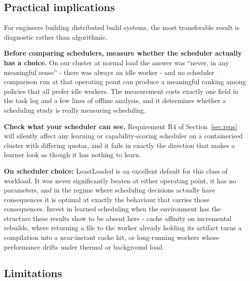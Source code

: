 \documentclass[final,5p,times,twocolumn]{elsarticle}
\begin{document}
\subsection{Practical implications}

For engineers building distributed build systems, the most transferable result is diagnostic rather than algorithmic.

\textbf{Before comparing schedulers, measure whether the scheduler actually has a choice.} On our cluster at normal load the answer was ``never, in any meaningful sense'' - there was always an idle worker - and no scheduler comparison run at that operating point can produce a meaningful ranking among policies that all prefer idle workers. The measurement costs exactly one field in the task log and a few lines of offline analysis, and it determines whether a scheduling study is really measuring scheduling.

\textbf{Check what your scheduler can see.} Requirement R4 of Section~\ref{sec:reqs} will silently affect any learning or capability-scoring scheduler on a containerised cluster with differing quotas, and it fails in exactly the direction that makes a learner look as though it has nothing to learn.

\textbf{On scheduler choice:} LeastLoaded is an excellent default for this class of workload. It was never significantly beaten at either operating point, it has no parameters, and in the regime where scheduling decisions actually have consequences it is optimal at exactly the behaviour that carries those consequences. Invest in learned scheduling when the environment has the structure these results show to be absent here - cache affinity on incremental rebuilds, where returning a file to the worker already holding its artifact turns a compilation into a near-instant cache hit, or long-running workers whose performance drifts under thermal or background load.

\subsection{Limitations}
\label{sec:limitations}
\end{document}
